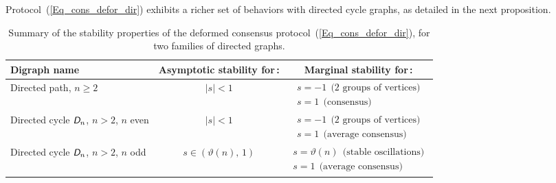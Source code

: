 \documentclass[letterpaper,9pt,twocolumn]{autart}
\begin{document}
Protocol~(\ref{Eq_cons_defor_dir}) exhibits a richer set of behaviors with directed cycle graphs, as detailed in the next proposition. \begin{table*}[t!]
\renewcommand{\arraystretch}{1.42}
\begin{center}
  \begin{tabular}{|l|c|c|} \hline
    \textbf{Digraph name} & \textbf{Asymptotic stability for\,:} & \textbf{Marginal stability for\,:}\\
    \hline\hline
    Directed path, $n \geq 2$ & $|s| < 1$ & 
    $
    \begin{array}{c}
    s = -1\;\, \text{(2 groups of vertices)}\\
    s = 1 \;\, \text{(consensus)}
    \end{array}
    $\vspace{0.01cm}\\
    \hline
    Directed cycle $\emph{\textsf{D}}_n$, $n > 2$, $n$ even & $|s| <
    1$ &  
    $
    \begin{array}{c}
    s = -1\;\, \text{(2 groups of vertices)}\\
    s = 1 \;\, \text{(average consensus)}
    \end{array}
    $ \vspace{0.01cm}\\
    \hline
    Directed cycle $\emph{\textsf{D}}_n$, $n > 2$, $n$ odd & $s \in
    (\vartheta(n),\,1)$ & 
    $
    \begin{array}{c}
    s = \vartheta(n)\;\, \text{(stable oscillations)}\\ s = 1\;\, \text{(average consensus)}
    \end{array}
    $ \vspace{0.01cm}\\
    \hline
  \end{tabular}
  \vspace{0.4cm}
  \caption{Summary of the stability properties of the deformed consensus protocol~(\ref{Eq_cons_defor_dir}),
  for two families of directed graphs.}\label{Table2}
\end{center}
\end{table*}
\end{document}
